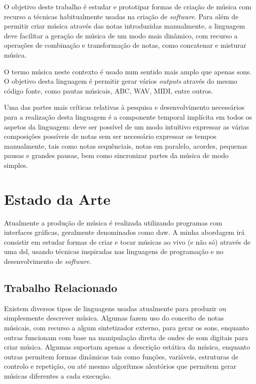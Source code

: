 \documentclass[
  oneside,
  11pt, a4paper,
  footinclude=true,
  headinclude=true,
  cleardoublepage=empty
]{scrbook}
\begin{document}
    O objetivo deste trabalho é estudar e prototipar formas de criação de música com recurso a técnicas habitualmente usadas na criação de \textit{software}. Para além de permitir criar música através das notas introduzidas manualmente, a linguagem deve facilitar a geração de música de um modo mais dinâmico, com recurso a operações de combinação e transformação de notas, como concatenar e misturar música.
    
    O termo música neste contexto é usado num sentido mais amplo que apenas sons. O objetivo desta linguagem é permitir gerar vários \textit{outputs} através do mesmo código fonte, como pautas músicais, ABC, WAV, MIDI, entre outros.

    Uma das partes mais críticas relativas à pesquisa e desenvolvimento necessários para a realização desta linguagem é a componente temporal implícita em todos os aspetos da linguagem: deve ser possível de um modo intuítivo expressar as várias composições possíveis de notas sem ser necessário expressar os tempos manualmente, tais como notas sequênciais, notas em paralelo, acordes, pequenas pausas e grandes pausas, bem como sincronizar partes da música de modo simples.

	\chapter{Estado da Arte}
    Atualmente a produção de música é realizada utilizando programas com interfaces gráficas, geralmente denominados como \acrfull{daw}. A minha abordagem irá consistir em estudar formas de criar e tocar músicas ao vivo (e não só) através de uma \acrfull{dsl}, usando técnicas inspiradas nas linguagens de programação e no desenvolvimento de \textit{software}.

	\section{Trabalho Relacionado}
	Existem diversos tipos de linguagens usadas atualmente para produzir ou simplesmente descrever música. Algumas fazem uso do conceito de notas músicais, com recurso a algum sintetizador externo, para gerar os sons, enquanto outras funcionam com base na manipulação direta de ondes de som digitais para criar música. Algumas suportam apenas a descrição estática da música, enquanto outras permitem formas dinâmicas tais como funções, variáveis, estruturas de controlo e repetição, ou até mesmo algorítmos aleatórios que permitem gerar músicas diferentes a cada execução.
	
\end{document}
